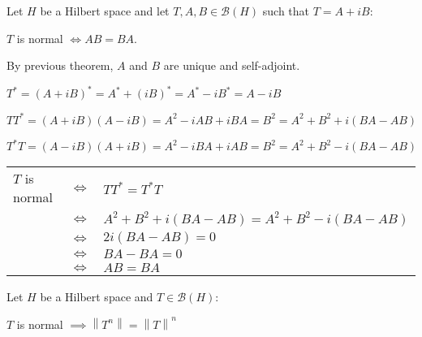 \documentclass[letterpaper,12pt,fleqn]{article}
\newcommand{\mb}{\mathcal{B}}
\newcommand{\norm}[1]{\left\|#1\right\|}
\begin{document}
\begin{theorem}
  Let $H$ be a Hilbert space and let $T,A,B\in\mb(H)$ such that $T=A+iB$:

  \qquad$T$ is normal $\iff AB=BA$.
\end{theorem}

\begin{theproof}
  By previous theorem, $A$ and $B$ are unique and self-adjoint.

  $T^*=(A+iB)^*=A^*+(iB)^*=A^*-iB^*=A-iB$

  $TT^*=(A+iB)(A-iB)=A^2-iAB+iBA=B^2=A^2+B^2+i(BA-AB)$

  $T^*T=(A-iB)(A+iB)=A^2-iBA+iAB=B^2=A^2+B^2-i(BA-AB)$

  \begin{tabular}{lcl}
    $T$ is normal & $\iff$ & $TT^*=T^*T$ \\
    & $\iff$ & $A^2+B^2+i(BA-AB)=A^2+B^2-i(BA-AB)$ \\
    & $\iff$ & $2i(BA-AB)=0$ \\
    & $\iff$ & $BA-BA=0$ \\
    & $\iff$ & $AB=BA$
  \end{tabular}
\end{theproof}

\begin{theorem}
  Let $H$ be a Hilbert space and $T\in\mb(H)$:

  \qquad$T$ is normal $\implies\norm{T^n}=\norm{T}^n$
\end{theorem}
\end{document}
